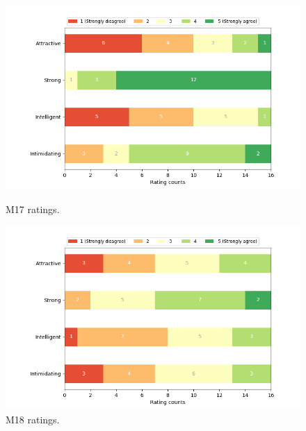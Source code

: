 \begin{figure}[H]
  \includegraphics[width=\linewidth]{Survey/MRatings/avatar_m17.png}
  \caption{M17 ratings.}
\endminipage\hfill
{}
  \includegraphics[width=\linewidth]{Survey/MRatings/avatar_m18.png}
  \caption{M18 ratings.}
\endminipage\hfill
\end{figure}